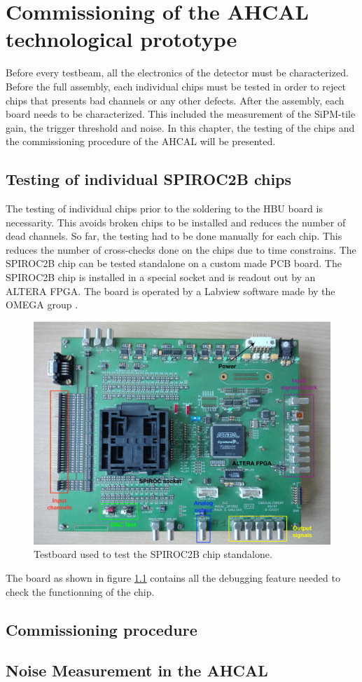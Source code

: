 \chapter{Commissioning of the AHCAL technological prototype}

Before every testbeam, all the electronics of the detector must be characterized. Before the full assembly, each individual chips must be tested in order to reject chips that presents bad channels or any other defects. After the assembly, each board needs to be characterized. This included the measurement of the SiPM-tile gain, the trigger threshold and noise. In this chapter, the testing of the chips and the commissioning procedure of the AHCAL will be presented.

\section{Testing of individual SPIROC2B chips}

The testing of individual chips prior to the soldering to the HBU board is necessarity. This avoids broken chips to be installed and reduces the number of dead channels. So far, the testing had to be done manually for each chip. This reduces the number of cross-checks done on the chips due to time constrains. The SPIROC2B chip can be tested standalone on a custom made PCB board. The SPIROC2B chip is installed in a special socket and is readout out by an ALTERA FPGA. The board is operated by a Labview software made by the OMEGA group \cite{}.

\begin{figure}[htbp!]
  \centering
  \includegraphics[width=1\linewidth]{chap4/fig_Commi/TestBoard.jpg}
  \caption{Testboard used to test the SPIROC2B chip standalone.} \label{fig:Testboard_SP2B}
\end{figure}

The board as shown in figure \ref{fig:Testboard_SP2B} contains all the debugging feature needed to check the functionning of the chip.

\section{Commissioning procedure}

\section{Noise Measurement in the AHCAL}
